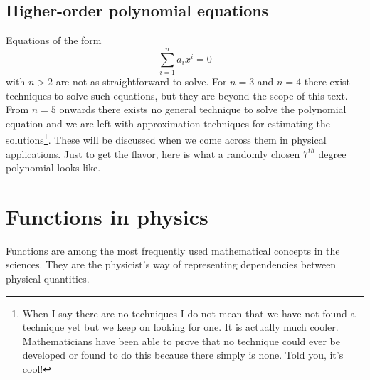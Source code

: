 \subsection{Higher-order polynomial equations}

\noindent Equations of the form
$$
\sum\limits_{i=1}^{n} a_i x^i = 0
$$
with $n>2$ are not as straightforward to solve. For $n=3$ and $n=4$ there exist techniques to solve such equations, but they are beyond the scope of this text. From $n=5$ onwards there exists no general technique to solve the polynomial equation and we are left with approximation techniques for estimating the solutions\footnote{When I say there are no techniques I do not mean that we have not found a technique yet but we keep on looking for one. It is actually much cooler. Mathematicians have been able to prove that no technique could ever be developed or found to do this because there simply is none. Told you, it's cool!}. These will be discussed when we come across them in physical applications. Just to get the flavor, here is what a randomly chosen $7^{th}$ degree polynomial looks like.
\begin{center}
\end{center}

\section{Functions in physics}

\noindent Functions are among the most frequently used mathematical concepts in the sciences. They are the physicist's way of representing dependencies between physical quantities.\\

